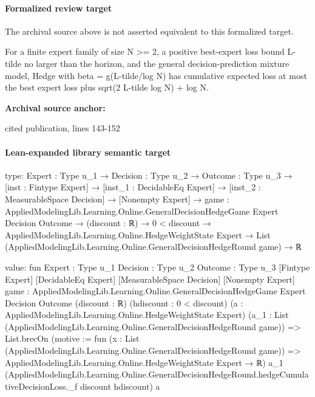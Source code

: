 \documentclass[10pt]{article}
\begin{document}
\paragraph{Formalized review target}
The archival source above is not asserted equivalent to this formalized target.
\begin{ReviewVerbatim}
For a finite expert family of size N >= 2, a positive best-expert loss bound L-tilde no larger than the horizon, and the general decision-prediction mixture model, Hedge with beta = g(L-tilde/log N) has cumulative expected loss at most the best expert loss plus sqrt(2 L-tilde log N) + log N.
\end{ReviewVerbatim}

\textbf{Archival source anchor:} {\footnotesize\raggedright cited publication, lines 143-\allowbreak{}152\par}
\paragraph{Lean-expanded library semantic target}
\begin{ReviewVerbatim}
type:
{Expert : Type u_1} →
  {Decision : Type u_2} →
    {Outcome : Type u_3} →
      [inst : Fintype Expert] →
        [inst_1 : DecidableEq Expert] →
          [inst_2 : MeasurableSpace Decision] →
            [Nonempty Expert] →
              {game : AppliedModelingLib.Learning.Online.GeneralDecisionHedgeGame Expert Decision Outcome} →
                (discount : ℝ) →
                  0 < discount →
                    AppliedModelingLib.Learning.Online.HedgeWeightState Expert →
                      List (AppliedModelingLib.Learning.Online.GeneralDecisionHedgeRound game) → ℝ

value:
fun {Expert : Type u_1} {Decision : Type u_2} {Outcome : Type u_3} [Fintype Expert] [DecidableEq Expert]
    [MeasurableSpace Decision] [Nonempty Expert]
    {game : AppliedModelingLib.Learning.Online.GeneralDecisionHedgeGame Expert Decision Outcome} (discount : ℝ)
    (hdiscount : 0 < discount) (a : AppliedModelingLib.Learning.Online.HedgeWeightState Expert)
    (a_1 : List (AppliedModelingLib.Learning.Online.GeneralDecisionHedgeRound game)) =>
  List.brecOn (motive := fun (x : List (AppliedModelingLib.Learning.Online.GeneralDecisionHedgeRound game)) =>
    AppliedModelingLib.Learning.Online.HedgeWeightState Expert → ℝ) a_1
    (AppliedModelingLib.Learning.Online.GeneralDecisionHedgeRound.hedgeCumulativeDecisionLoss._f discount hdiscount) a
\end{ReviewVerbatim}
\end{document}
